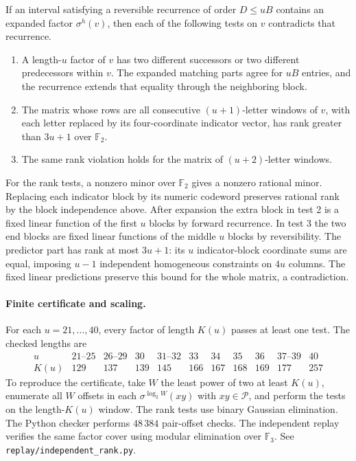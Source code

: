 \documentclass[10pt]{article}
\begin{document}
If an interval satisfying a reversible recurrence of order \(D\le uB\) contains an expanded factor \(\sigma^h(v)\), then each of the following tests on \(v\) contradicts that recurrence.
\begin{enumerate}
\item A length-\(u\) factor of \(v\) has two different successors or two different predecessors within \(v\). The expanded matching parts agree for \(uB\) entries, and the recurrence extends that equality through the neighboring block.
\item The matrix whose rows are all consecutive \((u+1)\)-letter windows of \(v\), with each letter replaced by its four-coordinate indicator vector, has rank greater than \(3u+1\) over \(\mathbb F_2\).
\item The same rank violation holds for the matrix of \((u+2)\)-letter windows.
\end{enumerate}
For the rank tests, a nonzero minor over \(\mathbb F_2\) gives a nonzero rational minor. Replacing each indicator block by its numeric codeword preserves rational rank by the block independence above. After expansion the extra block in test 2 is a fixed linear function of the first \(u\) blocks by forward recurrence. In test 3 the two end blocks are fixed linear functions of the middle \(u\) blocks by reversibility. The predictor part has rank at most \(3u+1\): its \(u\) indicator-block coordinate sums are equal, imposing \(u-1\) independent homogeneous constraints on \(4u\) columns. The fixed linear predictions preserve this bound for the whole matrix, a contradiction.

\paragraph{Finite certificate and scaling.}
For each \(u=21,\ldots,40\), every factor of length \(K(u)\) passes at least one test. The checked lengths are
\[
\begin{array}{c|rrrrrrrrrr}
u &21\text{--}25&26\text{--}29&30&31\text{--}32&33&34&35&36&37\text{--}39&40\\
\hline
K(u)&129&137&139&145&166&167&168&169&177&257
\end{array}
\]
To reproduce the certificate, take \(W\) the least power of two at least \(K(u)\), enumerate all \(W\) offsets in each \(\sigma^{\log_2 W}(xy)\) with \(xy\in\mathcal P\), and perform the tests on the length-\(K(u)\) window. The rank tests use binary Gaussian elimination. The Python checker performs \(48\,384\) pair-offset checks. The independent replay verifies the same factor cover using modular elimination over \(\mathbb F_3\). See \nolinkurl{replay/independent_rank.py}.
\end{document}
